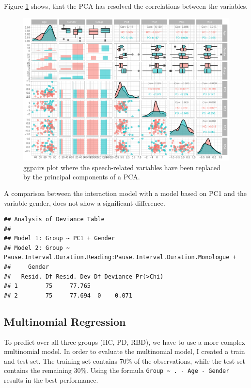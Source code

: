 \documentclass[
  english,
  doc,floatsintext]{apa6}
\begin{document}
Figure \ref{fig:pca-ggpairs} shows, that the PCA has resolved the correlations between the variables.

\begin{figure}
\centering
\includegraphics{dap_report_anja_probst_files/figure-latex/pca-ggpairs-1.pdf}
\caption{\label{fig:pca-ggpairs}ggpairs plot where the speech-related variables have been replaced by the principal components of a PCA.}
\end{figure}

A comparison between the interaction model with a model based on PC1 and the variable gender,
does not show a significant difference.

\begin{verbatim}
## Analysis of Deviance Table
## 
## Model 1: Group ~ PC1 + Gender
## Model 2: Group ~ Pause.Interval.Duration.Reading:Pause.Interval.Duration.Monologue + 
##     Gender
##   Resid. Df Resid. Dev Df Deviance Pr(>Chi)
## 1        75     77.765                     
## 2        75     77.694  0    0.071
\end{verbatim}

\hypertarget{multinomial-regression}{%
\subsection{Multinomial Regression}\label{multinomial-regression}}

To predict over all three groups (HC, PD, RBD), we have to use a more complex
multinomial model. In order to evaluate the multinomial model, I created a train and
test set. The training set contains 70\% of the observations, while the test set contains the
remaining 30\%. Using the formula \texttt{Group\ \textasciitilde{}\ .\ -\ Age\ -\ Gender} results in the best performance.
\end{document}
